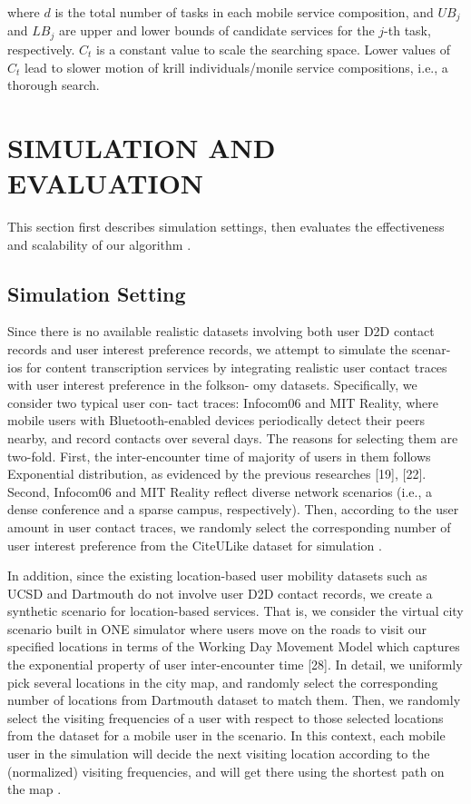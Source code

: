 \documentclass[10pt,journal,compsoc]{IEEEtran}
\begin{document}
where $d$ is the total number of tasks in each mobile service composition, and $UB_j$ and $LB_j$ are upper and lower bounds of candidate services for the $j$-th task, respectively. $C_t$ is a constant value to scale the searching space. Lower values of $C_t$ lead to slower motion of krill individuals/monile service compositions, i.e., a thorough search.


\section{SIMULATION AND EVALUATION}

This section first describes simulation settings, then evaluates the effectiveness and scalability of our algorithm \cite{Wu2016}.

\subsection{Simulation Setting}
Since there is no available realistic datasets involving both user D2D contact records and user interest preference records, we attempt to simulate the scenar- ios for content transcription services by integrating realistic user contact traces with user interest preference in the folkson- omy datasets. Specifically, we consider two typical user con- tact traces: Infocom06 and MIT Reality, where mobile users with Bluetooth-enabled devices periodically detect their peers nearby, and record contacts over several days. The reasons for selecting them are two-fold. First, the inter-encounter time of majority of users in them follows Exponential distribution, as evidenced by the previous researches [19], [22]. Second, Infocom06 and MIT Reality reflect diverse network scenarios (i.e., a dense conference and a sparse campus, respectively). Then, according to the user amount in user contact traces, we randomly select the corresponding number of user interest preference from the CiteULike dataset for simulation \cite{Pu2017}.

In addition, since the existing location-based user mobility datasets such as UCSD and Dartmouth do not involve user D2D contact records, we create a synthetic scenario for location-based services. That is, we consider the virtual city scenario built in ONE simulator where users move on the roads to visit our specified locations in terms of the Working Day Movement Model which captures the exponential property of user inter-encounter time [28]. In detail, we uniformly pick several locations in the city map, and randomly select the corresponding number of locations from Dartmouth dataset to match them. Then, we randomly select the visiting frequencies of a user with respect to those selected locations from the dataset for a mobile user in the scenario. In this context, each mobile user in the simulation will decide the next visiting location according to the (normalized) visiting frequencies, and will get there using the shortest path on the map \cite{Deng2017}.
\end{document}
